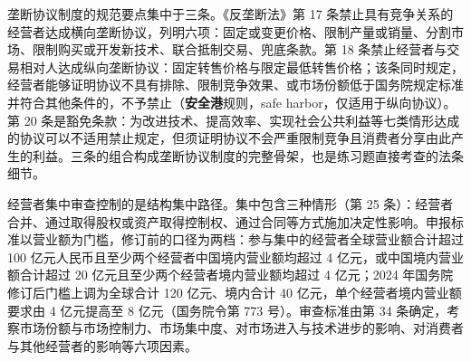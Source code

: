 垄断协议制度的规范要点集中于三条。《反垄断法》第 17 条禁止具有竞争关系的经营者达成横向垄断协议，列明六项：固定或变更价格、限制产量或销量、分割市场、限制购买或开发新技术、联合抵制交易、兜底条款。第 18 条禁止经营者与交易相对人达成纵向垄断协议：固定转售价格与限定最低转售价格；该条同时规定，经营者能够证明协议不具有排除、限制竞争效果、或市场份额低于国务院规定标准并符合其他条件的，不予禁止（\textbf{安全港}规则，safe harbor，仅适用于纵向协议）。第 20 条是豁免条款：为改进技术、提高效率、实现社会公共利益等七类情形达成的协议可以不适用禁止规定，但须证明协议不会严重限制竞争且消费者分享由此产生的利益。三条的组合构成垄断协议制度的完整骨架，也是练习题直接考查的法条细节。

经营者集中审查控制的是结构集中路径。集中包含三种情形（第 25 条）：经营者合并、通过取得股权或资产取得控制权、通过合同等方式施加决定性影响。申报标准以营业额为门槛，修订前的口径为两档：参与集中的经营者全球营业额合计超过 100 亿元人民币且至少两个经营者中国境内营业额均超过 4 亿元，或中国境内营业额合计超过 20 亿元且至少两个经营者境内营业额均超过 4 亿元；2024 年国务院修订后门槛上调为全球合计 120 亿元、境内合计 40 亿元，单个经营者境内营业额要求由 4 亿元提高至 8 亿元（国务院令第 773 号）。审查标准由第 34 条确定，考察市场份额与市场控制力、市场集中度、对市场进入与技术进步的影响、对消费者与其他经营者的影响等六项因素。


